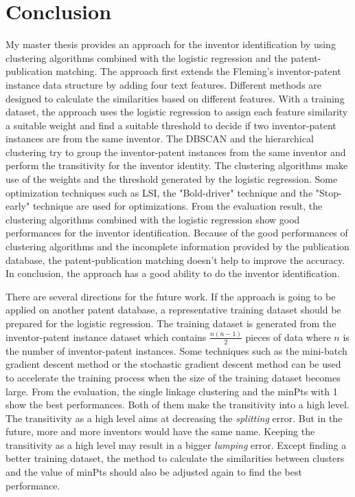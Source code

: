 \chapter{Conclusion}
\label{cha:concl}

My master thesis provides an approach for the inventor identification by using clustering algorithms combined with the logistic regression and the patent-publication matching. The approach first extends the Fleming's inventor-patent instance data structure by adding four text features. Different methods are designed to calculate the similarities based on different features. With a training dataset, the approach uses the logistic regression to assign each feature similarity a suitable weight and find a suitable threshold to decide if two inventor-patent instances are from the same inventor. The DBSCAN and the hierarchical clustering try to group the inventor-patent instances from the same inventor and perform the transitivity for the inventor identity. The clustering algorithms make use of the weights and the threshold generated by the logistic regression. Some optimization techniques such as LSI, the "Bold-driver" technique and the "Stop-early" technique are used for optimizations. From the evaluation result, the clustering algorithms combined with the logistic regression show good performances for the inventor identification. Because of the good performances of clustering algorithms and the incomplete information provided by the publication database, the patent-publication matching doesn't help to improve the accuracy. In conclusion, the approach has a good ability to do the inventor identification.
\newline

There are several directions for the future work. If the approach is going to be applied on another patent database, a representative training dataset should be prepared for the logistic regression. The training dataset is generated from the inventor-patent instance dataset which contains $\frac{n(n-1)}{2}$ pieces of data where $n$ is the number of inventor-patent instances. Some techniques such as the mini-batch gradient descent method or the stochastic gradient descent method can be used to accelerate the training process when the size of the training dataset becomes large. From the evaluation, the single linkage clustering and the minPts with 1 show the best performances. Both of them make the transitivity into a high level. The transitivity as a high level aims at decreasing the \emph{splitting} error. But in the future, more and more inventors would have the same name. Keeping the transitivity as a high level may result in a bigger \emph{lumping} error. Except finding a better training dataset, the method to calculate the similarities between clusters and the value of minPts should also be adjusted again to find the best performance. 

\newpage
\thispagestyle{empty}
\rule{0cm}{5cm}



